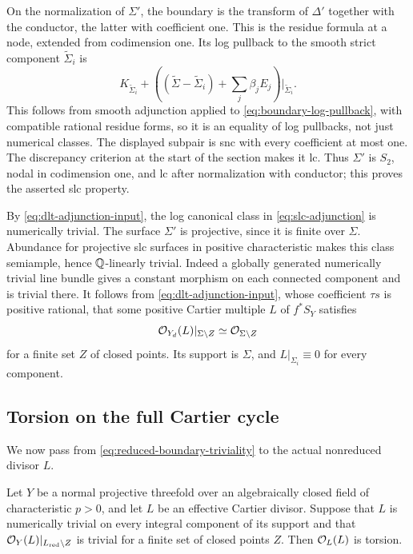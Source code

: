 On the normalization of \(\Sigma'\), the boundary is the transform of
\(\Delta'\) together with the conductor, the latter with coefficient one.
This is the residue formula at a node, extended from codimension one.
Its log pullback to the smooth strict component
\(\widetilde\Sigma_i\) is
\[
 K_{\widetilde\Sigma_i}
 +\left((\widetilde\Sigma-\widetilde\Sigma_i)
                   +\sum_j\beta_jE_j\right)|_{\widetilde\Sigma_i}.
\]
This follows from smooth adjunction applied to
\eqref{eq:boundary-log-pullback}, with compatible rational residue forms,
so it is an equality of log pullbacks, not just numerical classes.
The displayed subpair is snc with every coefficient at most one.
The discrepancy criterion at the start of the section makes it lc.
Thus \(\Sigma'\) is \(S_2\), nodal in codimension one, and lc after
normalization with conductor; this proves the asserted slc property.

By \eqref{eq:dlt-adjunction-input}, the log canonical class in
\eqref{eq:slc-adjunction} is numerically trivial.
The surface \(\Sigma'\) is projective, since it is finite over \(\Sigma\).
Abundance for projective slc surfaces in positive characteristic
\cite[Theorem~3.1]{posva2024} makes this class semiample, hence
\(\mathbb Q\)-linearly trivial.  Indeed a globally generated numerically trivial
line bundle gives a constant morphism on each connected component and
is trivial there.
It follows from \eqref{eq:dlt-adjunction-input}, whose coefficient
\(\tau s\) is positive rational, that some positive Cartier multiple
\(L\) of \(f^*S_Y\) satisfies
\begin{equation}
\label{eq:reduced-boundary-triviality}
 \mathcal O_{Y_d}(L)|_{\Sigma\setminus Z}\simeq\mathcal O_{\Sigma\setminus Z}
\end{equation}
for a finite set \(Z\) of closed points.
Its support is \(\Sigma\), and \(L|_{\Sigma_i}\equiv0\) for every component.

\subsection{Torsion on the full Cartier cycle}

We now pass from \eqref{eq:reduced-boundary-triviality} to the actual
nonreduced divisor \(L\).

\begin{lemma}
\label{lem:full-cycle-torsion}
Let \(Y\) be a normal projective threefold over an algebraically closed
field of characteristic \(p>0\), and let \(L\) be an effective Cartier
divisor.  Suppose that \(L\) is numerically trivial on every integral
component of its support and that \(\mathcal O_Y(L)|_{L_{\mathrm{red}}\setminus Z}\)
is trivial for a finite set of closed points \(Z\).
Then \(\mathcal O_L(L)\) is torsion.
\end{lemma}

